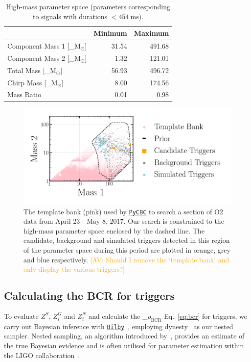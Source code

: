 \documentclass[%
 nofootinbib,
 amsmath,amssymb,
 aps,
 twocolumn
]{revtex4-2}
\newcommand{\bilby}{{\sc \href{https://lscsoft.docs.ligo.org/bilby/}{\texttt{Bilby}}}\xspace}
\newcommand{\dynesty}{{\sc dynesty}\xspace}
\newcommand{\pycbc}{{\sc \href{https://pycbc.org/}{\texttt{PyCBC}}}\xspace}
\newcommand{\mathcmd}[1]{{\sc \relax\ifmmode#1\else $#1$\fi}\xspace}
\newcommand{\bcr}{\mathcmd{\rho_\text{BCR}}}
\newcommand{\msun}{\mathcmd{\text{M}_\odot}}
\newcommand{\avi}[1]{\textcolor{orange}{[AV: #1]}}
\begin{document}
\begin{table}[t]

\caption[BBH parameters corresponding to duration $<454\ \text{ms}$]{\label{tab:parameters}High-mass parameter space (parameters corresponding to signals with durations $<454 \ \text{ms}$). }
\centering
\begin{tabular}{lrr}
\toprule
  & Minimum & Maximum\\
\midrule
Component Mass 1 [\msun] & 31.54 & 491.68\\
Component Mass 2 [\msun] & 1.32 & 121.01\\
Total Mass [\msun] & 56.93 & 496.72\\
Chirp Mass [\msun] & 8.00 & 174.56\\
Mass Ratio & 0.01 & 0.98\\
\end{tabular}
\end{table}



\begin{figure}[!ht]

{\centering \includegraphics[width=0.75\linewidth]{images/template_bank.png}

}
\caption[High-mass BCR search space.]{The template bank (pink) used by \pycbc to search a section of O2 data from $\text{April 23 - May 8, 2017}$. Our search is constrained to the high-mass parameter space enclosed by the dashed line. The candidate, background and simulated triggers detected in this region of the parameter space during this period are plotted in orange, grey and blue respectively.  \avi{Should I remove the `template bank' and only display the various triggers?}}\label{fig:templateBank}
\end{figure}


\subsection{Calculating the BCR for triggers}
To evaluate $Z^S$, $Z^G_i$ and $Z^N_i$ and calculate the \bcr Eq.~\ref{eq:bcr} for triggers, we carry out Bayesian inference with \bilby~\cite{bilby, bilby_pipe}, employing \dynesty~\cite{dynesty} as our nested sampler. Nested sampling, an algorithm introduced by~\citet{skilling2004, skilling2006}, provides an estimate of the true Bayesian evidence and is often utilised for parameter estimation within the LIGO collaboration~\cite{bilby, bilby_paper, pbilby_paper}.
\end{document}
